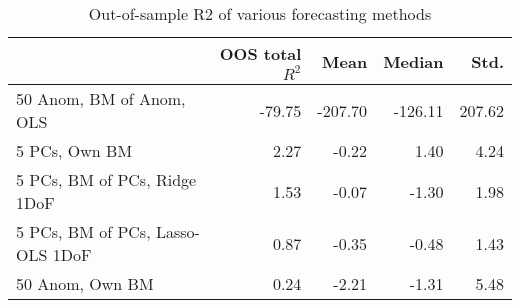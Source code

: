 \begin{table}
\caption{Out-of-sample R2 of various forecasting methods}
\begin{tabular}{lrrrr}
\toprule
 & OOS total $R^2$ & Mean & Median & Std. \\
\midrule
50 Anom, BM of Anom, OLS & -79.75 & -207.70 & -126.11 & 207.62 \\
5 PCs, Own BM & 2.27 & -0.22 & 1.40 & 4.24 \\
5 PCs, BM of PCs, Ridge 1DoF & 1.53 & -0.07 & -1.30 & 1.98 \\
5 PCs, BM of PCs, Lasso-OLS 1DoF & 0.87 & -0.35 & -0.48 & 1.43 \\
50 Anom, Own BM & 0.24 & -2.21 & -1.31 & 5.48 \\
\bottomrule
\end{tabular}
\end{table}
